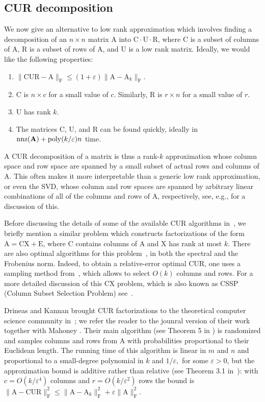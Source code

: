 \documentclass[11pt]{article}
\newcommand{\FNorm }[1]{\mbox{}\|#1\|_\mathrm{F}  }
\newcommand{\FNormS}[1]{\mbox{}\|#1\|_\mathrm{F}^2}
\newcommand{\mat}[1]{{\ensuremath{\bm{\mathrm{#1}}}}}
\def\matA{\mat{A}}
\def\matC{\mat{C}}
\def\matE{\mat{E}}
\def\matR{\mat{R}}
\def\matU{\mat{U}}
\def\matX{\mat{X}}
\def\nnz{{ \rm nnz }}
\newcommand{\eps}{\varepsilon}
\newcommand{\poly}{{\mathrm{poly}}}
\begin{document}
\subsection{CUR decomposition}\label{sec:CUR}
We now give an alternative to low rank approximation which involves finding a decomposition of an $n \times n$ matrix $\matA$
into $\matC \cdot \matU \cdot \matR$, where $\matC$ is a subset of columns of $\matA$, $\matR$ is a subset of rows of 
$\matA$, and $\matU$ is a low rank matrix. 
Ideally, we would like the following properties:
\begin{enumerate}
\item $\FNorm{\matC \matU \matR - \matA} \leq (1+\eps) \FNorm{\matA-\matA_k}.$
\item $\matC$ is $n \times c$ for a small value of $c$. Similarly, $\matR$ is $r \times n$ for a small value of $r$.
\item $\matU$ has rank $k$.
\item The matrices $\matC$, $\matU$, and $\matR$ can be found quickly, ideally in $\nnz(\matA) + \poly(k/\eps)n$ time. 
\end{enumerate}
A CUR decomposition of a matrix is thus a rank-$k$ approximation whose column space and row space are spanned by a small subset of 
actual rows and columns
of $\matA$. This often makes it more interpretable than a generic low rank approximation, or even the SVD, whose column and row spaces are
spanned by arbitrary linear combinations of all of the columns and rows of $\matA$, respectively, see, e.g., \cite{MD09} for a discussion
of this. 

Before discussing the details of some of the available CUR algorithms in~\cite{DK03,DKM06c,DMM08,DM09,GM13,WZ13CUR,BW14}, we briefly mention a 
similar problem
which constructs factorizations of the form $\matA = \matC \matX + \matE$, where $\matC$ contains columns of $\matA$ and $\matX$ has rank at
most $k$. There are also optimal algorithms for this problem~\cite{BDM11a,GS12}, in both the spectral and the Frobenius norm. Indeed, to
obtain a relative-error optimal CUR, one uses a sampling method from~\cite{BDM11a}, which allows to select $O(k)$ columns and rows.
For a more detailed discussion of this CX problem, which is also known as CSSP (Column Subset Selection Problem) see~\cite{BMD09a,BDM11a,GS12}.

Drineas and Kannan brought CUR factorizations to the theoretical computer science community in~\cite{DK03}; we
refer the reader to the jounral version of their work together with Mahoney \cite{DKM06c}. 
Their main algorithm (see Theorem 5 in \cite{DKM06c}) 
is randomized and samples columns and rows from $\matA$ with probabilities proportional
to their Euclidean length. The running time of this algorithm is linear in $m$ and $n$ and proportional to a
small-degree polynomial in $k$ and $1/\varepsilon,$ for some $\varepsilon >0$,
but the approximation bound is additive rather than relative 
(see Theorem 3.1 in~\cite{DK03}): with $c = O(k/\varepsilon^4)$ columns and $r=O(k/\varepsilon^2)$ rows
the bound is 
$
\FNormS{\matA - \matC \matU \matR} \le \FNormS{\matA - \matA_k} + \varepsilon \FNormS{\matA}.
$
\end{document}

